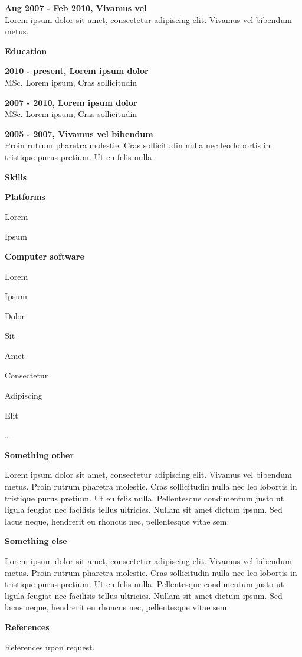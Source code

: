 \documentclass[a4paper,12pt,final]{memoir}
\newcommand{\Sep}{\vspace{1.5em}}
\newcommand{\SmallSep}{\vspace{0.5em}}
\newcommand{\CVSection}[1]
	{\Large\textbf{#1}\par
	\SmallSep\normalsize\normalfont}
\newcommand{\CVItem}[1]
	{\textbf{\color{RoyalBlue} #1}}
\begin{document}
\CVItem{Aug 2007 - Feb 2010, Vivamus vel}\\
Lorem ipsum dolor sit amet, consectetur adipiscing elit. Vivamus vel bibendum metus.
\Sep

\CVSection{Education}
\CVItem{2010 - present, Lorem ipsum dolor}\\
MSc. Lorem ipsum, Cras sollicitudin
\SmallSep

\CVItem{2007 - 2010, Lorem ipsum dolor}\\
MSc. Lorem ipsum, Cras sollicitudin
\SmallSep

\CVItem{2005 - 2007, Vivamus vel bibendum}\\
Proin rutrum pharetra molestie. Cras sollicitudin nulla nec leo lobortis in tristique purus pretium. Ut eu felis nulla.
\Sep

\CVSection{Skills}
\CVItem{Platforms}
\begin{multicols}{3}
\begin{compactitem}[\color{RoyalBlue}$\circ$]
	\item Lorem 
	\item Ipsum 
\end{compactitem}
\end{multicols}
\SmallSep

\CVItem{Computer software}
\begin{multicols}{3}
\begin{compactitem}[\color{RoyalBlue}$\circ$]
	\item Lorem 
	\item Ipsum 
	\item Dolor 
	\item Sit 
	\item Amet
	\item Consectetur 
	\item Adipiscing 
	\item Elit
	\item \ldots
\end{compactitem}
\end{multicols}
\Sep 

\CVSection{Something other}
Lorem ipsum dolor sit amet, consectetur adipiscing elit. Vivamus vel bibendum metus. Proin rutrum pharetra molestie. Cras sollicitudin nulla nec leo lobortis in tristique purus pretium. Ut eu felis nulla. Pellentesque condimentum justo ut ligula feugiat nec facilisis tellus ultricies. Nullam sit amet dictum ipsum. Sed lacus neque, hendrerit eu rhoncus nec, pellentesque vitae sem.

\clearpage
\framebreak
\framebreak

\CVSection{Something else}
Lorem ipsum dolor sit amet, consectetur adipiscing elit. Vivamus vel bibendum metus. Proin rutrum pharetra molestie. Cras sollicitudin nulla nec leo lobortis in tristique purus pretium. Ut eu felis nulla. Pellentesque condimentum justo ut ligula feugiat nec facilisis tellus ultricies. Nullam sit amet dictum ipsum. Sed lacus neque, hendrerit eu rhoncus nec, pellentesque vitae sem.
\Sep

\CVSection{References}
References upon request.

\end{document}
